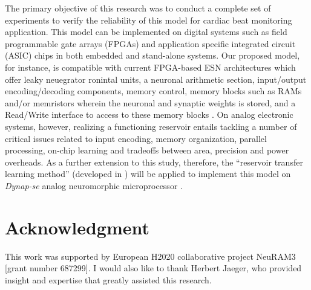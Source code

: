 \documentclass[review]{elsarticle}
\begin{document}
The primary objective of this research was to conduct a complete set of experiments to verify the reliability of this model for cardiac beat monitoring application. This model can be implemented on digital systems such as field programmable gate arrays (FPGAs) and application specific integrated circuit (ASIC) chips in both embedded and stand-alone systems. Our proposed model, for instance, is compatible with current FPGA-based ESN architectures which offer leaky neuegrator ronintal units, a neuronal arithmetic section, input/output encoding/decoding components, memory control, memory blocks such as RAMs and/or memristors wherein the neuronal and synaptic weights is stored, and a Read/Write interface to access to these memory blocks \cite{schrauwen2007compact}. On analog electronic systems, however, realizing a functioning reservoir entails tackling a number of critical issues related to input encoding, memory organization, parallel processing, on-chip learning and tradeoffs between area, precision and power overheads. As a further extension to this study, therefore, the ``reservoir transfer learning method'' (developed in \cite{he2018EMBS}) will be applied to implement this model on \textit{Dynap-se} analog neuromorphic microprocessor \cite{moradi2018scalable}.

\section*{Acknowledgment}
This work was supported by European H2020 collaborative project NeuRAM3 [grant number 687299]. I would also like to thank Herbert Jaeger, who provided insight and expertise that greatly assisted this research. 




\end{document}
